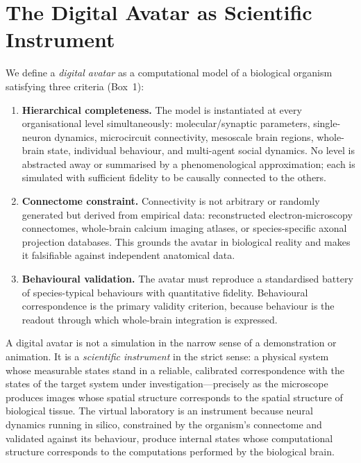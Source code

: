 \documentclass[12pt,a4paper]{article}
\begin{document}
\section*{The Digital Avatar as Scientific Instrument}

We define a \emph{digital avatar} as a computational model of a
biological organism satisfying three criteria (Box~1):

\begin{enumerate}[leftmargin=1.8em, topsep=4pt, itemsep=3pt]

  \item \textbf{Hierarchical completeness.}
    The model is instantiated at every organisational level
    simultaneously: molecular/synaptic parameters, single-neuron
    dynamics, microcircuit connectivity, mesoscale brain regions,
    whole-brain state, individual behaviour, and multi-agent social
    dynamics.
    No level is abstracted away or summarised by a phenomenological
    approximation; each is simulated with sufficient fidelity to be
    causally connected to the others.

  \item \textbf{Connectome constraint.}
    Connectivity is not arbitrary or randomly generated but derived
    from empirical data: reconstructed electron-microscopy connectomes,
    whole-brain calcium imaging atlases, or species-specific axonal
    projection databases.
    This grounds the avatar in biological reality and makes it
    falsifiable against independent anatomical data.

  \item \textbf{Behavioural validation.}
    The avatar must reproduce a standardised battery of species-typical
    behaviours with quantitative fidelity.
    Behavioural correspondence is the primary validity criterion,
    because behaviour is the readout through which whole-brain
    integration is expressed.

\end{enumerate}

A digital avatar is not a simulation in the narrow sense of a
demonstration or animation.
It is a \emph{scientific instrument} in the strict sense: a physical
system whose measurable states stand in a reliable, calibrated
correspondence with the states of the target system under
investigation---precisely as the microscope produces images whose
spatial structure corresponds to the spatial structure of biological
tissue.
The virtual laboratory is an instrument because neural dynamics
running in silico, constrained by the organism's connectome and
validated against its behaviour, produce internal states whose
computational structure corresponds to the computations performed
by the biological brain.
\end{document}

